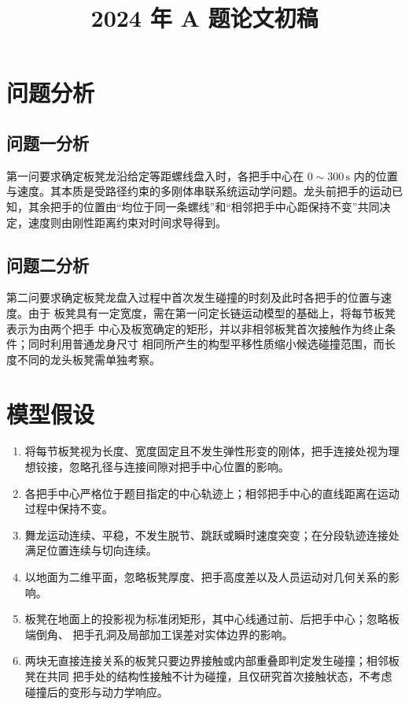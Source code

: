 \documentclass[
  11pt,
  UTF8]{ctexart}
\title{2024 年 A 题论文初稿}
\author{}
\date{}
\providecommand{\tightlist}{%
  \setlength{\itemsep}{0pt}\setlength{\parskip}{0pt}}
\begin{document}
\maketitle

\hypertarget{ux95eeux9898ux5206ux6790}{%
\section{问题分析}\label{ux95eeux9898ux5206ux6790}}

\subsection{问题一分析}

第一问要求确定板凳龙沿给定等距螺线盘入时，各把手中心在
\(0\sim300\,\mathrm{s}\)
内的位置与速度。其本质是受路径约束的多刚体串联系统运动学问题。龙头前把手的运动已知，其余把手的位置由``均位于同一条螺线''和``相邻把手中心距保持不变''共同决定，速度则由刚性距离约束对时间求导得到。

\subsection{问题二分析}

第二问要求确定板凳龙盘入过程中首次发生碰撞的时刻及此时各把手的位置与速度。由于
板凳具有一定宽度，需在第一问定长链运动模型的基础上，将每节板凳表示为由两个把手
中心及板宽确定的矩形，并以非相邻板凳首次接触作为终止条件；同时利用普通龙身尺寸
相同所产生的构型平移性质缩小候选碰撞范围，而长度不同的龙头板凳需单独考察。

\hypertarget{ux6a21ux578bux5047ux8bbe}{%
\section{模型假设}\label{ux6a21ux578bux5047ux8bbe}}

\begin{enumerate}
\def\labelenumi{\arabic{enumi}.}
\tightlist
\item
  将每节板凳视为长度、宽度固定且不发生弹性形变的刚体，把手连接处视为理想铰接，忽略孔径与连接间隙对把手中心位置的影响。
\item
  各把手中心严格位于题目指定的中心轨迹上；相邻把手中心的直线距离在运动过程中保持不变。
\item
  舞龙运动连续、平稳，不发生脱节、跳跃或瞬时速度突变；在分段轨迹连接处满足位置连续与切向连续。
\item
  以地面为二维平面，忽略板凳厚度、把手高度差以及人员运动对几何关系的影响。
\item
  板凳在地面上的投影视为标准闭矩形，其中心线通过前、后把手中心；忽略板端倒角、
  把手孔洞及局部加工误差对实体边界的影响。
\item
  两块无直接连接关系的板凳只要边界接触或内部重叠即判定发生碰撞；相邻板凳在共同
  把手处的结构性接触不计为碰撞，且仅研究首次接触状态，不考虑碰撞后的变形与动力学响应。
\end{enumerate}
\end{document}
